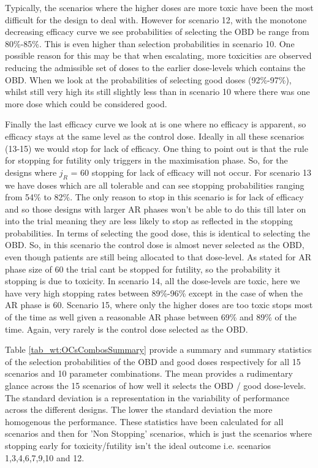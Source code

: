 Typically, the scenarios where the higher doses are more toxic have been the most difficult for the design to deal with. However for scenario 12, with the monotone decreasing efficacy curve we see probabilities of selecting the OBD be range from 80\%-85\%. This is even higher than selection probabilities in scenario 10. One possible reason for this may be that when escalating, more toxicities are observed reducing the admissible set of doses to the earlier dose-levels which contains the OBD. When we look at the probabilities of selecting good doses (92\%-97\%), whilst still very high its still slightly less than in scenario 10 where there was one more dose which could be considered good. 

Finally the last efficacy curve we look at is one where no efficacy is apparent, so efficacy stays at the same level as the control dose. Ideally in all these scenarios (13-15) we would stop for lack of efficacy. One thing to point out is that the rule for stopping for futility only triggers in the maximisation phase. So, for the designs where $j_R$ = 60 stopping for lack of efficacy will not occur. For scenario 13 we have doses which are all tolerable and can see stopping probabilities ranging from 54\% to 82\%. The only reason to stop in this scenario is for lack of efficacy and so those designs with larger AR phases won't be able to do this till later on into the trial meaning they are less likely to stop as reflected in the stopping probabilities. In terms of selecting the good dose, this is identical to selecting the OBD. So, in this scenario the control dose is almost never selected as the OBD, even though patients are still being allocated to that dose-level. As stated for AR phase size of 60 the trial cant be stopped for futility, so the probability it stopping is due to toxicity. In scenario 14, all the dose-levels are toxic, here we have very high stopping rates between 89\%-96\% except in the case of when the AR phase is 60. Scenario 15, where only the higher doses are too toxic stops most of the time as well given a reasonable AR phase between 69\% and 89\% of the time. Again, very rarely is the control dose selected as the OBD. 

Table \ref{tab_wt:OCsCombosSummary} provide a summary and summary statistics of the selection probabilities of the OBD and good doses respectively for all 15 scenarios and 10 parameter combinations. The mean provides a rudimentary glance across the 15 scenarios of how well it selects the OBD / good dose-levels. The standard deviation is a representation in the variability of performance across the different designs. The lower the standard deviation the more homogenous the performance. These statistics have been calculated for all scenarios and then for 'Non Stopping' scenarios, which is just the scenarios where stopping early for toxicity/futility isn't the ideal outcome i.e. scenarios 1,3,4,6,7,9,10 and 12. 

